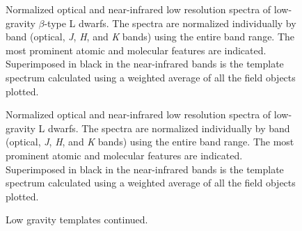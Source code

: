 \documentclass[12pt,preprint]{aastex}
\begin{document}
\begin{figure}
	\caption{Normalized optical and near-infrared low resolution spectra of low-gravity $\beta$-type L
dwarfs. The spectra are normalized individually by band (optical, \emph{J}, \emph{H}, and \emph{K} bands)
using the entire band range. The most prominent atomic and molecular features are indicated. Superimposed in black in the near-infrared
bands is the template spectrum calculated using a weighted average of all the
field objects plotted.}
	\label{fig:beta_templates}
\end{figure}


\begin{figure}
	\caption{Normalized optical and near-infrared low resolution spectra of low-gravity L
dwarfs. The spectra are normalized individually by band (optical, \emph{J}, \emph{H}, and \emph{K} bands)
using the entire band range. The most prominent atomic and molecular features are indicated. Superimposed in black in the near-infrared
bands is the template spectrum calculated using a weighted average of all the
field objects plotted. }
	\label{fig:gamma_templates}
\end{figure}

\begin{figure}
	\caption{Low gravity templates continued.}
\end{figure}
\end{document}

